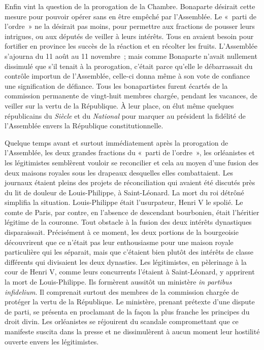 \documentclass[french,twoside]{book} %
\begin{document}
Enfin vint la question de la prorogation de la Chambre. Bonaparte désirait cette mesure pour pouvoir opérer sans en être empêché par l’Assemblée. Le « parti de l’ordre » ne la désirait pas moins, pour permettre aux fractions de pousser leurs intrigues, ou aux députés de veiller à leurs intérêts. Tous en avaient besoin pour fortifier en province les succès de la réaction et en récolter les fruits. L’Assemblée s’ajourna du 11 août au 11 novembre ; mais comme Bonaparte n’avait nullement dissimulé que s’il tenait à la prorogation, c’était parce qu’elle le débarrassait du contrôle importun de l’Assemblée, celle-ci donna même à son vote de confiance une signification de défiance. Tous les bonapartistes furent écartés de la commission permanente de vingt-huit membres chargée, pendant les vacances, de veiller sur la vertu de la République. À leur place, on élut même quelques républicains du \emph{Siècle} et du \emph{National} pour marquer au président la fidélité de l’Assemblée envers la République constitutionnelle.\par
Quelque temps avant et surtout immédiatement après la prorogation de l’Assemblée, les deux grandes fractions du « parti de l’ordre », les orléanistes et les légitimistes semblèrent vouloir se reconcilier et cela au moyen d’une fusion des deux maisons royales sous les drapeaux desquelles elles combattaient. Les journaux étaient pleins des projets de réconciliation qui avaient été discutés près du lit de douleur de Louis-Philippe, à Saint-Léonard. La mort du roi détrôné simplifia la situation. Louis-Philippe était l’usurpateur, Henri V le spolié. Le comte de Paris, par contre, en l’absence de descendant bourbonien, était l’héritier légitime de la couronne. Tout obstacle à la fusion des deux intérêts dynastiques disparaissait. Précisément à ce moment, les deux portions de la bourgeoisie découvrirent que ce n’était pas leur enthousiasme pour une maison royale particulière qui les séparait, mais que c’étaient bien plutôt des intérêts de classe différents qui divisaient les deux dynasties. Les légitimistes, en pèlerinage à la cour de Henri V, comme leurs concurrents l’étaient à Saint-Léonard, y apprirent la mort de Louis-Philippe. Ils formèrent aussitôt un ministère \emph{in partibus infidelium}. Il comprenait surtout des membres de la commission chargée de protéger la vertu de la République. Le ministère, prenant prétexte d’une dispute de parti, se présenta en proclamant de la façon la plus franche les principes du droit divin. Les orléanistes se réjouirent du scandale compromettant que ce manifeste suscita dans la presse et ne dissimulèrent à aucun moment leur hostilité ouverte envers les légitimistes.\par
\end{document}
